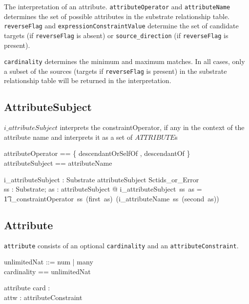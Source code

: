 \documentclass{article}
\def\spec#1{{\tt #1}}
\begin{document}
   
   


The interpretation of an attribute.  \spec{attributeOperator} and \spec{attributeName}
determines the set of possible attributes in the substrate relationship table.  \spec{reverseFlag} and
\spec{expressionConstraintValue} determine the set of candidate targets (if \spec{reverseFlag}
is absent) or \spec{source\_direction} (if \spec{reverseFlag} is present).

\spec{cardinality} determines the minimum and maximum matches.  In all cases, only a subset of the sources 
(targets if \spec{reverseFlag} is present) in the substrate relationship table will be returned in the interpretation.

\subsection{AttributeSubject}

$i\_attributeSubject$ interprets the constraintOperator, if any in the context of the attribute name and
interprets it as a set of $ATTRIBUTE$s

\begin{zed}

attributeOperator ==  \{ descendantOrSelfOf , descendantOf \} \\
attributeSubject == \optional[attributeOperator] \cross attributeName 
\end{zed}

\begin{gendef}
   i\_attributeSubject : Substrate \pfun attributeSubject \pfun Sctids\_or\_Error \\
\where
   \forall ss : Substrate; as : attributeSubject @ i\_attributeSubject~ss~as = \\
\t1 i\_constraintOperator~ss~(first~as)~(i\_attributeName~ss~(second~as)) \\
\end{gendef}
\subsection{Attribute}
\spec{attribute} consists of an optional \spec{cardinality} and an \spec{attributeConstraint}.
\begin{zed}
unlimitedNat ::= num \ldata \nat \rdata | many \\
cardinality == \nat \cross unlimitedNat \\
\end{zed}
\begin{schema}{attribute}
   card : \optional[cardinality] \\
   attw : attributeConstraint
\end{schema}
\end{document}
